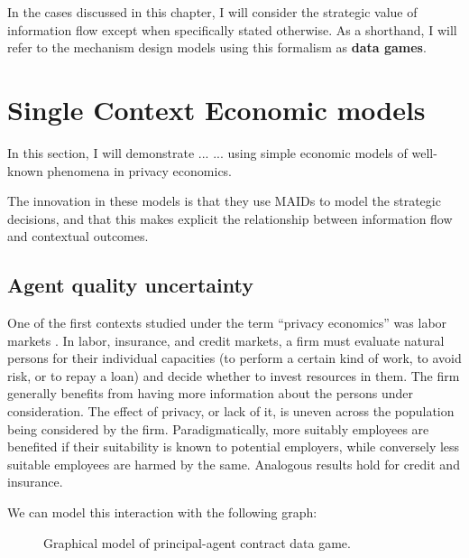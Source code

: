 \documentclass[../thesis.tex]{subfiles}
\begin{document}
In the cases discussed in this chapter, I will consider
the strategic value of information flow except when specifically
stated otherwise.
As a shorthand, I will refer to the mechanism design models
using this formalism as \textbf{data games}.

\section{Single Context Economic models}
\label{sec:single-context}

In this section, I will demonstrate ...
... using simple economic models of well-known
phenomena in privacy economics.

The innovation in these models is that they
use MAIDs to model the strategic decisions,
and that this makes explicit the relationship
between information flow and contextual outcomes.

\subsection{Agent quality uncertainty}
\label{sec:agent-quality}

One of the first contexts studied under the
term ``privacy economics'' was labor
markets \cite{posner1981economics}.
In labor, insurance, and credit markets,
a firm must evaluate natural persons
for their individual capacities (to perform a certain kind
of work, to avoid risk, or to repay a loan) and decide
whether to invest resources in them.
The firm generally benefits from having more information
about the persons under consideration.
The effect of privacy, or lack of it, is uneven across
the population being considered by the firm.
Paradigmatically, more suitably employees are benefited
if their suitability is known to potential employers,
while conversely less suitable employees are harmed
by the same.
Analogous results hold for credit and insurance.

We can model this interaction with the following graph:

\begin{figure}
\begin{center}
\end{center}
\caption{Graphical model of principal-agent contract data game.}
\end{figure}
\end{document}
